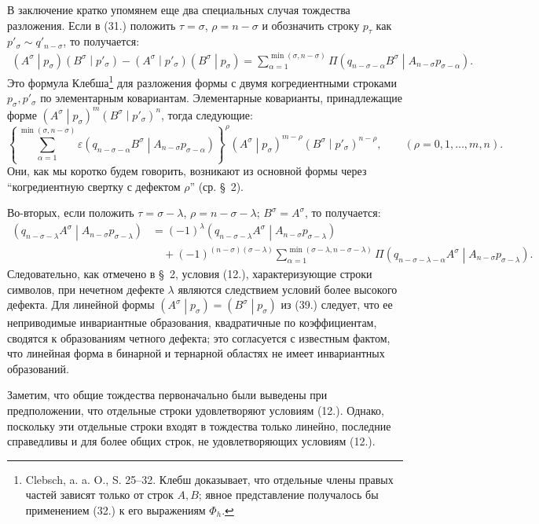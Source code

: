 \documentclass[11pt]{article}
\newcommand{\pair}[2]{\left(#1\middle|#2\right)}
\newcommand{\eps}{\varepsilon}
\begin{document}
В заключение кратко упомянем еще два специальных случая тождества разложения. Если в (31.) положить $\tau=\sigma$, $\rho=n-\sigma$ и обозначить строку $p_\tau$ как $p'_\sigma\sim q'_{n-\sigma}$, то получается:
\begin{equation}
\begin{aligned}
\pair{A^\sigma}{p_\sigma}\pair{B^\sigma}{p'_\sigma}
-\pair{A^\sigma}{p'_\sigma}\pair{B^\sigma}{p_\sigma}
=\sum_{\alpha=1}^{\min(\sigma,n-\sigma)}
\Pi\pair{q_{n-\sigma-\alpha}B^\sigma}{A_{n-\sigma}p_{\sigma-\alpha}}.
\end{aligned}
\tag{37}
\end{equation}
Это формула Клебша\footnote{Clebsch, a. a. O., S. 25--32. Клебш доказывает, что отдельные члены правых частей зависят только от строк $A,B$; явное представление получалось бы применением (32.) к его выражениям $\Phi_h$.} для разложения формы с двумя когредиентными строками $p_\sigma,p'_\sigma$ по элементарным ковариантам. Элементарные коварианты, принадлежащие форме $\pair{A^\sigma}{p_\sigma}^m\pair{B^\sigma}{p'_\sigma}^n$, тогда следующие:
\begin{equation}
 \left\{\sum_{\alpha=1}^{\min(\sigma,n-\sigma)}
 \eps\pair{q_{n-\sigma-\alpha}B^\sigma}{A_{n-\sigma}p_{\sigma-\alpha}}
 \right\}^{\rho}
 \pair{A^\sigma}{p_\sigma}^{m-\rho}\pair{B^\sigma}{p'_\sigma}^{n-\rho},
 \qquad (\rho=0,1,\ldots,m,n).
\tag{38}
\end{equation}
Они, как мы коротко будем говорить, возникают из основной формы через ``когредиентную свертку с дефектом $\rho$'' (ср. \S\ 2).

Во-вторых, если положить $\tau=\sigma-\lambda$, $\rho=n-\sigma-\lambda$; $B^\sigma=A^\sigma$, то получается:
\begin{equation}
\begin{aligned}
\pair{q_{n-\sigma-\lambda}A^\sigma}{A_{n-\sigma}p_{\sigma-\lambda}}
&=(-1)^\lambda
\pair{q_{n-\sigma-\lambda}A^\sigma}{A_{n-\sigma}p_{\sigma-\lambda}}\\
&\quad+(-1)^{(n-\sigma)(\sigma-\lambda)}
 \sum_{\alpha=1}^{\min(\sigma-\lambda,n-\sigma-\lambda)}
 \Pi\pair{q_{n-\sigma-\lambda-\alpha}A^\sigma}
 {A_{n-\sigma}p_{\sigma-\lambda}}.
\end{aligned}
\tag{39}
\end{equation}
Следовательно, как отмечено в \S\ 2, условия (12.), характеризующие строки символов, при нечетном дефекте $\lambda$ являются следствием условий более высокого дефекта. Для линейной формы $\pair{A^\sigma}{p_\sigma}=\pair{B^\sigma}{p_\sigma}$ из (39.) следует, что ее неприводимые инвариантные образования, квадратичные по коэффициентам, сводятся к образованиям четного дефекта; это согласуется с известным фактом, что линейная форма в бинарной и тернарной областях не имеет инвариантных образований.

Заметим, что общие тождества первоначально были выведены при предположении, что отдельные строки удовлетворяют условиям (12.). Однако, поскольку эти отдельные строки входят в тождества только линейно, последние справедливы и для более общих строк, не удовлетворяющих условиям (12.).
\end{document}
